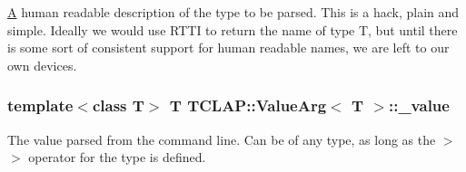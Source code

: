 \hyperlink{class_a}{A} human readable description of the type to be parsed. This is a hack, plain and simple. Ideally we would use R\+T\+T\+I to return the name of type T, but until there is some sort of consistent support for human readable names, we are left to our own devices. \hypertarget{class_t_c_l_a_p_1_1_value_arg_a45d5fdfce5865c02e6663f7438d485c7}{
\subsubsection[{\+\_\+value}]{\setlength{\rightskip}{0pt plus 5cm}template$<$class T$>$ T {\bf T\+C\+L\+A\+P\+::\+Value\+Arg}$<$ T $>$\+::\+\_\+value\hspace{0.3cm}{\ttfamily [protected]}}}\label{class_t_c_l_a_p_1_1_value_arg_a45d5fdfce5865c02e6663f7438d485c7}
The value parsed from the command line. Can be of any type, as long as the $>$$>$ operator for the type is defined. 